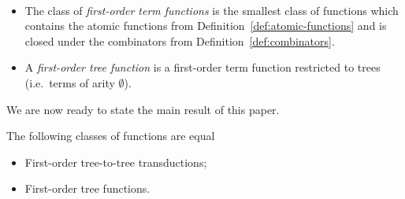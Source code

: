 \begin{definition} \label{def:fo-tree-functions} \ 
    \begin{itemize}
        \item The class of \emph{first-order term functions} is the smallest class of functions which contains the atomic functions from Definition~\ref{def:atomic-functions} and is closed under the combinators from Definition~\ref{def:combinators}.
        \item  A \emph{first-order tree function} is a first-order term function restricted to trees (i.e.~terms of arity $\emptyset$).
    \end{itemize}    
\end{definition}


We are now ready to state the main result of this paper. 
\begin{theorem}\label{thm:main}
    The following classes of functions are equal\begin{itemize}
        \item First-order tree-to-tree transductions;
        \item First-order tree functions.
    \end{itemize}
\end{theorem}
